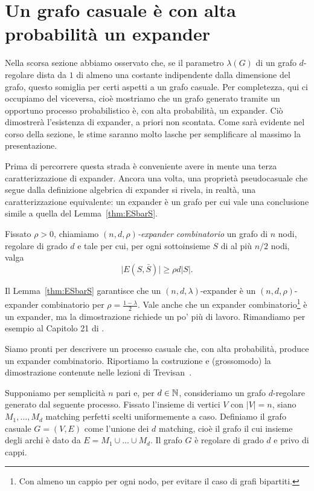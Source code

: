 \section{Un grafo casuale è con alta probabilità un expander} \label{sec:randomexpansion}

Nella scorsa sezione abbiamo osservato che, se il parametro $\lambda(G)$ di un
grafo $d$-regolare dista da $1$ di almeno una costante indipendente dalla
dimensione del grafo, questo somiglia per certi aspetti a un grafo casuale.
Per completezza, qui ci occupiamo del viceversa, cioè mostriamo che un grafo
generato tramite un opportuno processo probabilistico è, con alta probabilità,
un expander.
Ciò dimostrerà l'esistenza di expander, a priori non scontata.
Come sarà evidente nel corso della sezione, le stime saranno molto lasche per
semplificare al massimo la presentazione.

Prima di percorrere questa strada è conveniente avere in mente una terza
caratterizzazione di expander. Ancora una volta, una proprietà pseudocasuale
che segue dalla definizione algebrica di expander si rivela, in realtà, una
caratterizzazione equivalente: un expander è un grafo per cui vale una
conclusione simile a quella del Lemma~\ref{thm:ESbarS}.

\begin{definition}
	Fissato $\rho > 0$, chiamiamo \emph{$(n, d, \rho)$-expander combinatorio}
	un grafo di $n$ nodi, regolare di grado $d$ e tale per cui, per ogni
	sottoinsieme $S$ di al più $n / 2$ nodi, valga
	\[
		\lvert E(S, \bar S) \rvert \ge \rho d \lvert S \rvert.
	\]
\end{definition}

Il Lemma~\ref{thm:ESbarS} garantisce che un $(n, d, \lambda)$-expander è un
$(n, d, \rho)$-expander combinatorio per $\rho = \frac{1 - \lambda}{2}$.
Vale anche che un expander combinatorio\footnote{Con almeno un cappio per ogni
nodo, per evitare il caso di grafi bipartiti.} è un expander, ma la dimostrazione
richiede un po' più di lavoro. Rimandiamo per esempio al Capitolo 21 di
\cite{ABbook}.

Siamo pronti per descrivere un processo casuale che, con alta probabilità,
produce un expander combinatorio. Riportiamo la costruzione e (grossomodo) la
dimostrazione contenute nelle lezioni di Trevisan~\cite{Tre16}.

Supponiamo per semplicità $n$ pari e, per $d \in \mathbb{N}$, consideriamo un grafo
$d$-regolare generato dal seguente processo.
Fissato l'insieme di vertici $V$ con $|V| = n$, siano $M_1, \dots, M_d$
matching perfetti scelti uniformemente a caso.
Definiamo il grafo casuale $G = (V, E)$ come l'unione dei $d$ matching, cioè
il grafo il cui insieme degli archi è dato da $E = M_1 \cup \dots \cup M_d$.
Il grafo $G$ è regolare di grado $d$ e privo di cappi.

